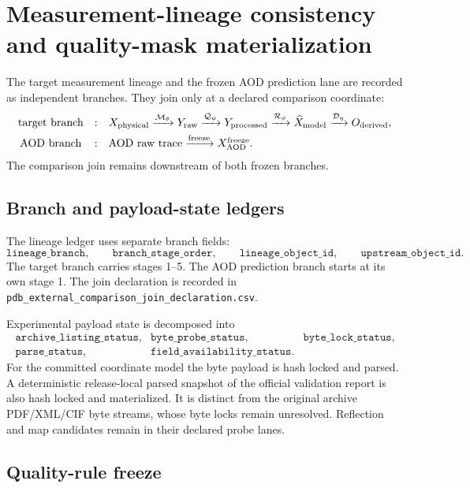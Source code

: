 \section{Measurement-lineage consistency and quality-mask materialization}
\label{sec:pdb-measurement-consistency-quality-mask}

The target measurement lineage and the frozen AOD prediction lane are recorded
as independent branches.  They join only at a declared comparison coordinate:
\[
\begin{array}{ccl}
\text{target branch}
&:&
X_{\rm physical}
\xrightarrow{\mathcal M_\theta}Y_{\rm raw}
\xrightarrow{\mathcal Q_\psi}Y_{\rm processed}
\xrightarrow{\mathcal R_\phi}\widehat X_{\rm model}
\xrightarrow{\mathcal D_\eta}O_{\rm derived},
\\[4pt]
\text{AOD branch}
&:&
\text{AOD raw trace}
\xrightarrow{\rm freeze}X_{\rm AOD}^{\rm freeze}.
\end{array}
\]
The comparison join remains downstream of both frozen branches.

\subsection{Branch and payload-state ledgers}

The lineage ledger uses separate branch fields:
\[
\texttt{lineage\_branch},\qquad
\texttt{branch\_stage\_order},\qquad
\texttt{lineage\_object\_id},\qquad
\texttt{upstream\_object\_id}.
\]
The target branch carries stages 1--5.  The AOD prediction branch starts at its
own stage 1.  The join declaration is recorded in
\texttt{pdb\_external\_comparison\_join\_declaration.csv}.

Experimental payload state is decomposed into
\[
\begin{array}{lll}
\texttt{archive\_listing\_status}, &
\texttt{byte\_probe\_status}, &
\texttt{byte\_lock\_status},\\
\texttt{parse\_status}, &
\texttt{field\_availability\_status}. &
\end{array}
\]
For the committed coordinate model the byte payload is hash locked and parsed.
A deterministic release-local parsed snapshot of the official validation report
is also hash locked and materialized.  It is distinct from the original archive
PDF/XML/CIF byte streams, whose byte locks remain unresolved.  Reflection and
map candidates remain in their declared probe lanes.

\subsection{Quality-rule freeze}

